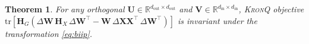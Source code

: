 \documentclass{article} %
\newtheorem{theorem}{Theorem}
\newcommand{\KronQ}{\textsc{KronQ}}
\begin{document}




\begin{theorem}
\label{thm:invariance}
For any orthogonal $\mathbf{U} \in \mathbb{R}^{d_{\mathrm{out}}\times d_{\mathrm{out}}}$ and $\mathbf{V} \in \mathbb{R}^{d_{\mathrm{in}}\times d_{\mathrm{in}}}$,  \KronQ{} objective $\mathrm{tr}\!\left[\mathbf{H}_G\!\left(
\Delta\mathbf{W}\,\mathbf{H}_X\,\Delta\mathbf{W}^\top 
- \mathbf{W}\,\Delta\mathbf{X}\mathbf{X}^\top\,\Delta\mathbf{W}^\top
\right)\right]$ is invariant under the transformation \eqref{eq:biip}.
\end{theorem}
\end{document}
